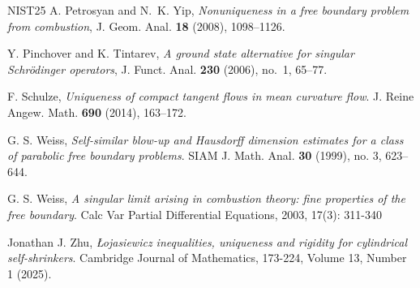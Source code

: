 \documentclass[11pt]{article}
\numberwithin{equation}{section}
\theoremstyle{definition}
\begin{document}
\begin{thebibliography}{NIST25}
 A. Petrosyan and N.~K. Yip, \textit{Nonuniqueness in a free boundary problem from combustion}, J. Geom. Anal. {\bf 18} (2008), 1098--1126.

 Y. Pinchover and K. Tintarev,
\textit{A ground state alternative for singular Schr\"odinger operators},
J. Funct. Anal. {\bf 230} (2006), no.~1, 65--77.

 F. Schulze, \textit{Uniqueness of compact tangent flows in mean curvature flow}. J. Reine Angew. Math. {\bf 690} (2014), 163--172.

 G. S. Weiss, \textit{Self-similar blow-up and Hausdorff dimension estimates for a class of parabolic free boundary problems}. SIAM J. Math. Anal. {\bf 30} (1999), no. 3, 623--644.

 G. S. Weiss, \textit{A singular limit arising in combustion theory: fine properties of the free boundary}. Calc Var Partial Differential Equations, 2003, 17(3): 311-340

 Jonathan J. Zhu, \textit{{\L}ojasiewicz inequalities, uniqueness and rigidity for cylindrical self-shrinkers}.
Cambridge Journal of Mathematics, 173-224, Volume 13, Number 1 (2025).


\end{thebibliography}
\end{document}
